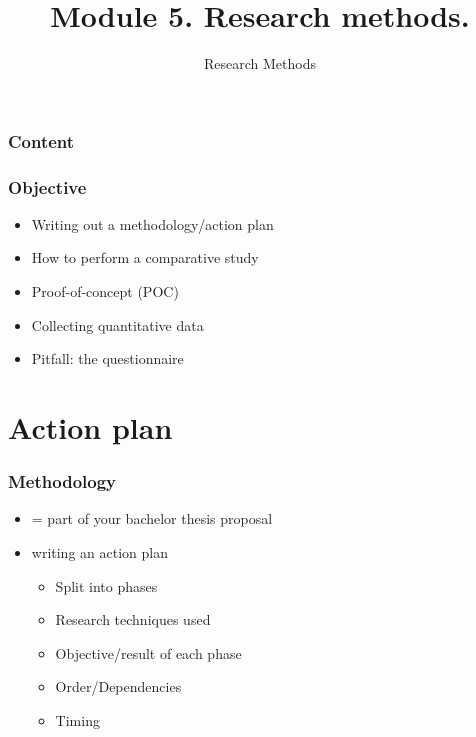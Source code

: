 \documentclass[aspectratio=169]{beamer}
\title{Module 5. Research methods.}
\subtitle{Research Methods}
\author{\lecturers}   %
\date{\academicyear}
\begin{document}
\begin{frame}
  \maketitle
\end{frame}

\begin{frame}
  \frametitle{Content}

  \tableofcontents
\end{frame}

\begin{frame}
  \frametitle{Objective}

  \begin{itemize}
    \item Writing out a methodology/action plan
    \item How to perform a comparative study   
    \item Proof-of-concept (POC)
    \item Collecting quantitative data
    \item Pitfall: the questionnaire      
  \end{itemize}
\end{frame}

\section{Action plan}

\begin{frame}
  \frametitle{Methodology}

  \begin{itemize}
      \item = part of your bachelor thesis proposal
      \item writing an action plan
      \begin{itemize}
          \item Split into phases
          \item Research techniques used
          \item Objective/result of each phase
          \item Order/Dependencies
          \item Timing   
    \end{itemize}
  \end{itemize}


\end{frame}
\end{document}
